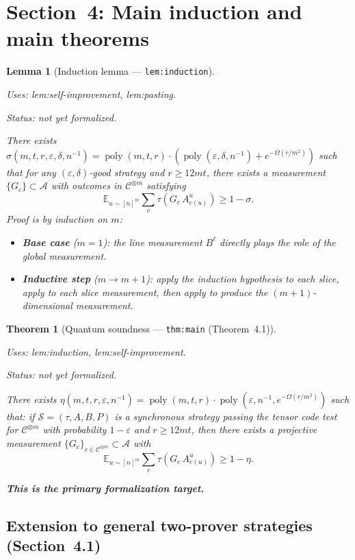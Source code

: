 \documentclass{article}
\providecommand{\uses}[1]{\par\smallskip\noindent\emph{Uses:} #1.\par\smallskip}
\providecommand{\notready}{\par\smallskip\noindent\emph{Status: not yet formalized.}\par\smallskip}
\newtheorem{lemma}[definition]{Lemma}
\newtheorem{theorem}[definition]{Theorem}
\theoremstyle{remark}
\newcommand{\E}{\mathbb{E}}
\newcommand{\code}{\mathcal{C}}
\newcommand{\algebra}{\mathcal{A}}
\newcommand{\eps}{\varepsilon}
\begin{document}
\section{Section~4: Main induction and main theorems}
\label{sec:main-loop}

\begin{lemma}[Induction lemma --- \texttt{lem:induction}]
	\label{lem:induction}
	\uses{lem:self-improvement, lem:pasting}
	\notready
	There exists
	$\sigma(m,t,r,\eps,\delta,n^{-1})=\operatorname{poly}(m,t,r)\cdot(\operatorname{poly}(\eps,\delta,n^{-1})+e^{-\Omega(r/m^2)})$
	such that for any $(\eps,\delta)$-good strategy and $r\ge 12mt$,
	there exists a measurement $\{G_c\}\subset\algebra$ with outcomes in
	$\code^{\otimes m}$ satisfying
	\[
		\E_{u\sim[n]^m}\sum_c\tau(G_c\,A^u_{c(u)})\ge 1-\sigma.
	\]
	Proof is by induction on $m$:
	\begin{itemize}
		\item \textbf{Base case} ($m=1$): the line measurement $B^\ell$ directly
		      plays the role of the global measurement.
		\item \textbf{Inductive step} ($m\to m+1$): apply the induction hypothesis
		      to each slice, apply  to each slice
		      measurement, then apply  to produce the $(m+1)$-dimensional
		      measurement.
	\end{itemize}
\end{lemma}

\begin{theorem}[Quantum soundness --- \texttt{thm:main} (Theorem~4.1)]
	\label{thm:main}
	\uses{lem:induction, lem:self-improvement}
	\notready
	There exists
	$\eta(m,t,r,\eps,n^{-1})=\operatorname{poly}(m,t,r)\cdot\operatorname{poly}(\eps,n^{-1},e^{-\Omega(r/m^2)})$
	such that: if $\mathcal{S}=(\tau,A,B,P)$ is a synchronous strategy passing
	the tensor code test for $\code^{\otimes m}$ with probability $1-\eps$ and
	$r\ge 12mt$, then there exists a projective measurement
	$\{G_c\}_{c\in\code^{\otimes m}}\subset\algebra$ with
	\[
		\E_{u\sim[n]^m}\sum_c\tau(G_c\,A^u_{c(u)})\ge 1-\eta.
	\]

	\textbf{This is the primary formalization target.}
\end{theorem}

\subsection{Extension to general two-prover strategies (Section~4.1)}
\end{document}
